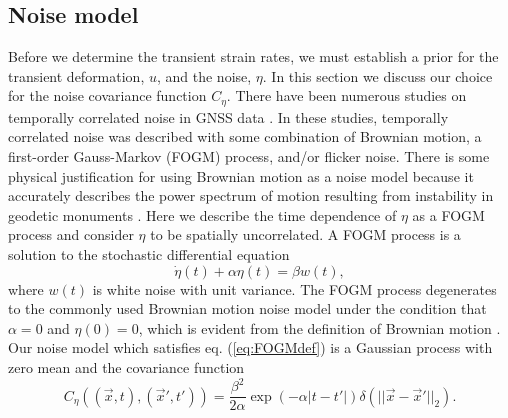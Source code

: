\documentclass[10pt,letter]{article}
\begin{document}
\subsection{Noise model}\label{sec:NoiseModel}
Before we determine the transient strain rates, we must establish a prior for the transient deformation, $u$, and the noise, $\eta$. In this section we discuss our choice for the noise covariance function $C_\eta$. There have been numerous studies on temporally correlated noise in GNSS data \citep[e.g.,][]{Zhang1997,Mao1999,Williams2004,Langbein2008}. In these studies, temporally correlated noise was described with some combination of Brownian motion, a first-order Gauss-Markov (FOGM) process, and/or flicker noise. There is some physical justification for using Brownian motion as a noise model because it accurately describes the power spectrum of motion resulting from instability in geodetic monuments \citep[e.g.,][]{Wyatt1982,Wyatt1989,Langbein1997}. Here we describe the time dependence of $\eta$ as a FOGM process and consider $\eta$ to be spatially uncorrelated. A FOGM process is a solution to the stochastic differential equation
\begin{equation}\label{eq:FOGMdef}
\dot{\eta}(t) + \alpha \eta(t) = \beta w(t),
\end{equation}
where $w(t)$ is white noise with unit variance. The FOGM process degenerates to the commonly used Brownian motion noise model under the condition that $\alpha=0$ and $\eta(0) = 0$, which is evident from the definition of Brownian motion \citep[e.g.,][]{Papoulis1991}. Our noise model which satisfies eq. (\ref{eq:FOGMdef}) is a Gaussian process with zero mean and the covariance function
\begin{equation}\label{eq:FOGM}
C_\eta\left((\vec{x},t),(\vec{x}',t')\right) = \frac{\beta^2}{2\alpha}\exp\left(-\alpha|t - t'|\right) \delta(||\vec{x} - \vec{x}'||_2). 
\end{equation}
\end{document}

